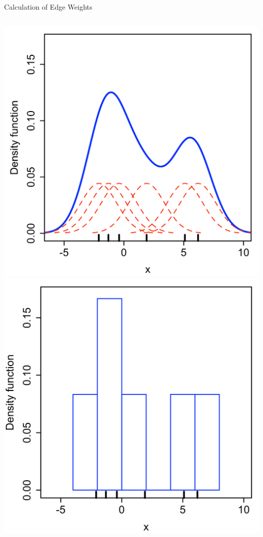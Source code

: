 \documentclass[14pt]{beamer}
\begin{document}
\begin{frame}{Calculation of Edge Weights}
    \begin{columns}
        \includegraphics[scale=0.08]{kde.png} \pause
        \includegraphics[scale=0.08]{histogram.png}
    \end{columns}
\end{frame}
\end{document}

